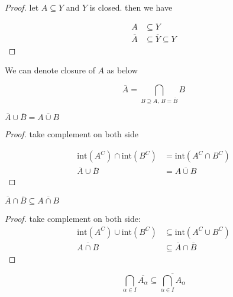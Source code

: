 \begin{proof}
    let $A \subseteq Y$ and $Y$ is closed. then we have

    \begin{align*}
        A &\subseteq Y \\
        \overline{A} &\subseteq \overline{Y} \subseteq Y
    \end{align*}
\end{proof}

\begin{corollary}
    We can denote closure of $A$ as below

    \[
        \overline{A} = \bigcap_{B \supseteq A,\, B = \overline{B}}B
    \]
\end{corollary}

\begin{lem}
    $\overline{A} \cup \overline{B} = \overline{A \cup B}$
\end{lem}

\begin{proof}
    take complement on both side

    \begin{align*}
        \mathrm{int}(A^C) \cap \mathrm{int}(B^C) &= \mathrm{int}(A^C \cap B^C) \\
        \overline{A} \cup \overline{B} &= \overline{A \cup B}
    \end{align*}
\end{proof}


\begin{lem}
    $\overline{A} \cap \overline{B} \subseteq \overline{A \cap B}$
\end{lem}


\begin{proof}
    take complement on both side:
    \begin{align*}
        \mathrm{int}(A^C) \cup \mathrm{int}(B^C) &\subseteq \mathrm{int}(A^C \cup B^C) \\
        \overline{A \cap B} & \subseteq \overline{A} \cap \overline{B} 
    \end{align*}
\end{proof}

\begin{corollary}
    \[
        \bigcap_{\alpha \in I} \overline{A_{\alpha}} \subseteq \overline{\bigcap_{\alpha \in I} A_{\alpha} }
    \]
\end{corollary}

